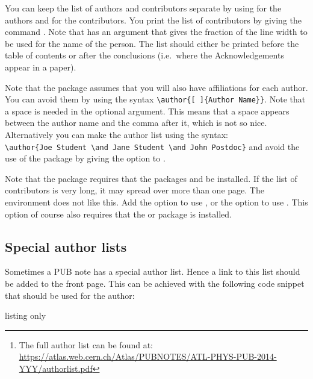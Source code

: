 You can keep the list of authors and contributors separate
by using  for the authors and  for the contributors.
You print the list of contributors by giving the command .
Note that  has an argument that gives the fraction of the line width
to be used for the name of the person.
The list should either be printed before the table of contents or after the conclusions
(i.e.\ where the Acknowledgements appear in a paper).

Note that the  package assumes that you will also have affiliations for each author.
You can avoid them by using the syntax \verb|\author{[ ]{Author Name}}|.
Note that a space is needed in the optional argument.
This means that a space appears between the author name and the comma after it, which is not so nice.
Alternatively you can make the author list using the syntax:\\
\verb|\author{Joe Student \and Jane Student \and John Postdoc}| and avoid the use of the
 package by giving the option  to .

Note that the  package requires that the packages 
 and  be installed.
If the list of contributors is very long, it may spread over more than one page.
The  environment does not like this.
Add the option  to use ,
or the option  to use .
This option of course also requires that the  or  package is installed.


\subsection{Special author lists}

Sometimes a PUB note has a special author list.
Hence a link to this list should be added to the front page.
This can be achieved with the following code snippet that should be used for the author:
\begin{tcblisting}{listing only}
\usepackage{authblk}
\author{The ATLAS Collaboration%
\thanks{The full author list can be found at:\\
  \url{https://atlas.web.cern.ch/Atlas/PUBNOTES/ATL-PHYS-PUB-2014-YYY/authorlist.pdf}}
}
\end{tcblisting}

